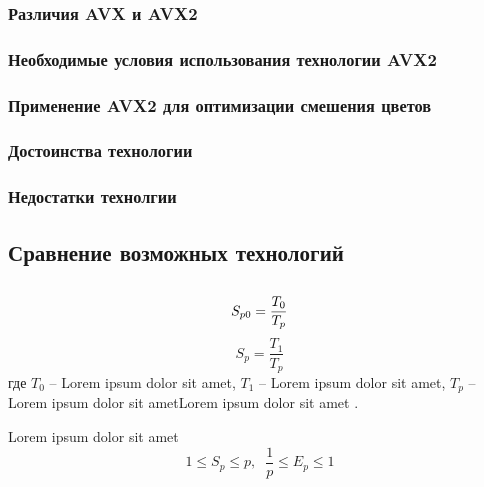 \subsubsection{Различия AVX и AVX2}
\subsubsection{Необходимые условия использования технологии AVX2}
\subsubsection{Применение AVX2 для оптимизации смешения цветов}
\subsubsection{Достоинства технологии}
\subsubsection{Недостатки технолгии}
\subsection{Сравнение возможных технологий}
\subsection{}



\begin{equation}
S_{p0}=\frac{T_{0} }{T_{p}} \\
\label{F:100}
\end{equation}
\begin{equation}
S_{p}=\frac{T_{1} }{T_{p}}
\label{F:101}
\end{equation}
где $T_{0}$ -- Lorem ipsum dolor sit amet, $T_{1}$ -- Lorem ipsum dolor sit amet, $T_{p}$ -- Lorem ipsum dolor sit ametLorem ipsum dolor sit amet . 

Lorem ipsum dolor sit amet
\begin{equation}
1\leq S_{p} \leq p,\; \;  \frac{1}{p} \leq E_{p} \leq 1
\label{F:103}
\end{equation}






